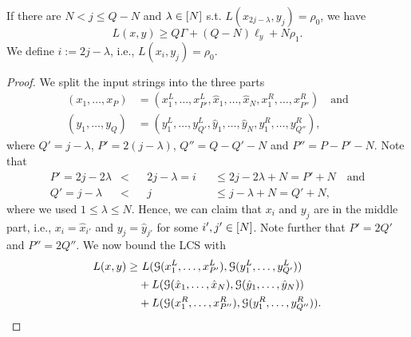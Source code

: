 \begin{lemma}
\label{lem:1-2vs1:ortho-lower-bound}
If there are $N < j \leq Q-N$ and $\lambda \in [N]$ s.t. $L(x_{2j-\lambda}, y_j) = \rho_0$, we have
\[ 
L(x,y) \geq Q\Gamma + (Q-N)\ell_y + N\rho_1.
\]
We define $i := 2j - \lambda$, i.e., $L(x_i, y_j) = \rho_0$.
\end{lemma}

\begin{proof}
We split the input strings into the three parts
\begin{align*}
(x_1, \ldots, x_P) &= (x^L_1, \ldots, x^L_{P'}, \hat{x}_1, \ldots, \hat{x}_N, x^R_1, \ldots, x^R_{P''}) \quad\text{and}\\
(y_1, \ldots, y_Q) &= (y^L_1, \ldots, y^L_{Q'}, \hat{y}_1, \ldots, \hat{y}_N, y^R_1, \ldots, y^R_{Q''}),
\end{align*}
where $Q' = j - \lambda$, $P' = 2(j - \lambda)$, $Q'' = Q - Q' - N$ and $P'' = P - P' - N$.
Note that
\begin{align*}
P' = 2j - 2\lambda &<& &2j - \lambda = i& &\leq 2j - 2\lambda + N = P' + N \quad\text{and}\\
Q' = j - \lambda &<& &j& &\leq j - \lambda + N = Q' + N,
\end{align*}
where we used $1 \leq \lambda \leq N$.
Hence, we can claim that $x_i$ and $y_j$ are in the middle part, i.e., $x_i = \hat{x}_{i'}$ and $y_j = \hat{y}_{j'}$ for some $i', j' \in [N]$.
Note further that $P' = 2Q'$ and $P'' = 2Q''$.
We now bound the LCS with
\begin{align*}
L(x,y) \geq &\ L(\mathcal{G}(x^L_1, \ldots, x^L_{P'}), \mathcal{G}(y^L_1, \ldots, y^L_{Q'})) \\
&+ L(\mathcal{G}(\hat{x}_1, \ldots, \hat{x}_N), \mathcal{G}(\hat{y}_1, \ldots, \hat{y}_N)) \\
&+ L(\mathcal{G}(x^R_1, \ldots, x^R_{P''}), \mathcal{G}(y^R_1, \ldots, y^R_{Q''})).
\end{align*}
\end{proof}





